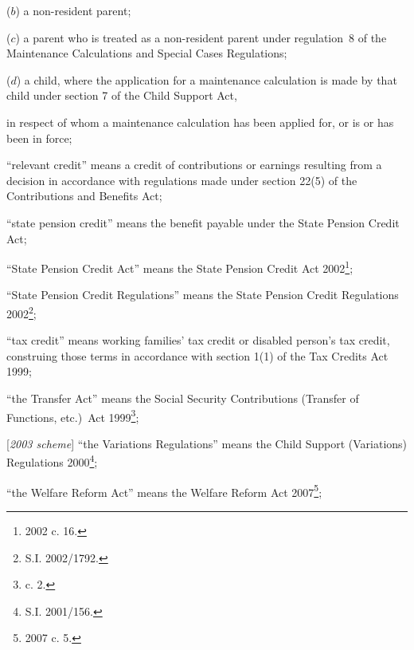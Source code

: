 \documentclass[12pt,a4paper]{article}
\begin{document}
\begin{enumerate}
\begin{enumerate}
    ($b$) 
    a non-resident parent;

    ($c$) 
    a parent who is treated as a non-resident parent under regulation~8 of the Maintenance Calculations and Special Cases Regulations;

    ($d$) 
    a child, where the application for a maintenance calculation is made by that child under section 7 of the Child Support Act,
\end{enumerate}
    in respect of whom a maintenance calculation has been applied for, 
or is or has been in force;

“relevant credit” means a credit of contributions or earnings resulting from a decision in accordance with regulations made under section 22(5) of the Contributions and Benefits Act;

“state pension credit” means the benefit payable under the State Pension Credit Act;

“State Pension Credit Act” means the State Pension Credit Act 2002\footnote{2002 c. 16.};

“State Pension Credit Regulations” means the State Pension Credit Regulations 2002\footnote{S.I. 2002/1792.};

“tax credit” means working families' tax credit or disabled person’s tax credit, construing those terms in accordance with section 1(1) of the Tax Credits Act 1999;

“the Transfer Act” means the Social Security Contributions (Transfer of Functions, etc.)\ Act 1999\footnote{ c. 2.};

[\emph{2003 scheme}] “the Variations Regulations” means the Child Support (Variations) Regulations 2000\footnote{\frenchspacing S.I. 2001/156.};

“the Welfare Reform Act” means the Welfare Reform Act 2007\footnote{2007 c. 5.};


\end{enumerate}
\end{document}
